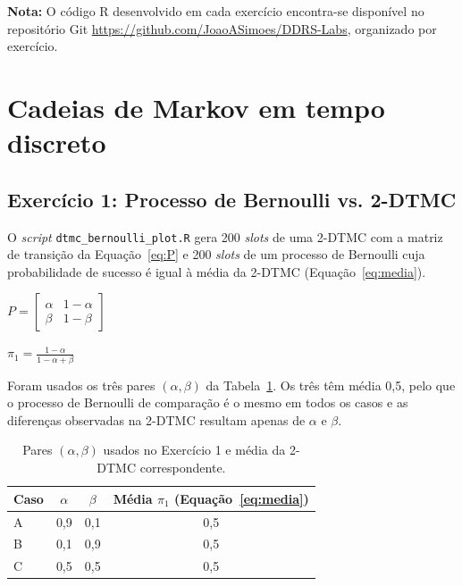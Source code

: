 \documentclass[10pt,a4paper]{article}
\newcommand{\formula}[3]{\begin{equacao}[H]\centering$\displaystyle #1$\caption{#2}\label{#3}\end{equacao}}
\begin{document}
\setcounter{page}{1}

\tableofcontents
\clearpage

{\raggedright\textbf{Nota:} O código R desenvolvido em cada exercício encontra-se disponível no repositório Git \mbox{\color{istblue}\url{https://github.com/JoaoASimoes/DDRS-Labs}}, organizado por exercício.\par}

\section{Cadeias de Markov em tempo discreto}

\subsection{Exercício 1: Processo de Bernoulli vs. 2-DTMC}

O \textit{script} \texttt{dtmc\_bernoulli\_plot.R} gera 200 \textit{slots} de uma 2-DTMC com a matriz de transição da Equação~\ref{eq:P} e 200 \textit{slots} de um processo de Bernoulli cuja probabilidade de sucesso é igual à média da 2-DTMC (Equação~\ref{eq:media}).

\formula{P=\begin{bmatrix}\alpha & 1-\alpha\\ \beta & 1-\beta\end{bmatrix}}{Matriz de transição da 2-DTMC.}{eq:P}

\formula{\pi_1=\frac{1-\alpha}{1-\alpha+\beta}}{Média da 2-DTMC (probabilidade estacionária do estado 1).}{eq:media}

Foram usados os três pares $(\alpha,\beta)$ da Tabela~\ref{tab:ex01}. Os três têm média 0,5, pelo que o processo de Bernoulli de comparação é o mesmo em todos os casos e as diferenças observadas na 2-DTMC resultam apenas de $\alpha$ e $\beta$.

\begin{table}[H]
\centering
\begin{tabular}{lccc}
\toprule
Caso & $\alpha$ & $\beta$ & Média $\pi_1$ (Equação~\ref{eq:media})\\
\midrule
A & 0,9 & 0,1 & 0,5\\
B & 0,1 & 0,9 & 0,5\\
C & 0,5 & 0,5 & 0,5\\
\bottomrule
\end{tabular}
\caption{Pares $(\alpha,\beta)$ usados no Exercício 1 e média da 2-DTMC correspondente.}
\label{tab:ex01}
\end{table}
\end{document}
